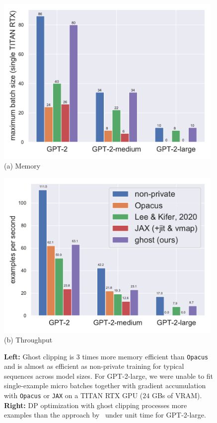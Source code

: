 \begin{figure}[htb]
\begin{center}
\begin{minipage}[t]{0.48\linewidth}
\centering
{\includegraphics[width=0.98\textwidth]{figs/mem.pdf}}
(a) Memory
\end{minipage}
\begin{minipage}[t]{0.48\linewidth}
\centering
{\includegraphics[width=0.98\textwidth]{figs/throughput.pdf}} 
(b) Throughput
\end{minipage}
\end{center}
\caption{
\textbf{Left:} 
Ghost clipping is 3 times more memory efficient than \texttt{Opacus} and is almost as efficient as non-private training for typical sequences across model sizes.
For GPT-2-large, we were unable to fit single-example micro batches together with gradient accumulation with \texttt{Opacus} or \texttt{JAX} on a TITAN RTX GPU ($24$ GBs of VRAM).
\textbf{Right:} DP optimization with ghost clipping processes  more examples than the approach by~\cite{lee2020scaling} under unit time for GPT-2-large.
}
\label{fig:ghost_clipping}
\end{figure}
